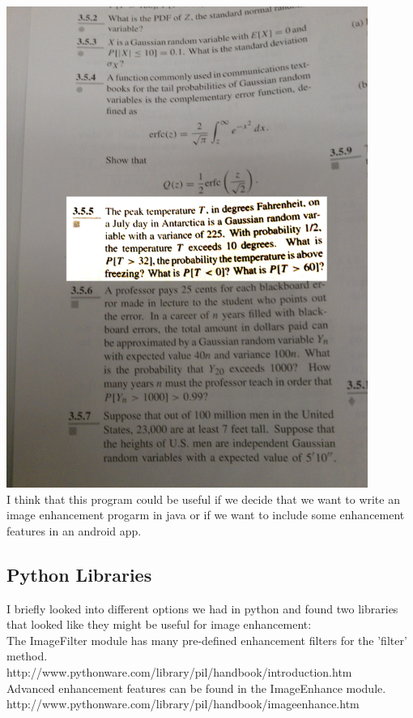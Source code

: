 \documentclass[]{article}
\begin{document}
		\includegraphics{images/ImageClarityWithImageJ.jpg} \\
		
		I think that this program could be useful if we decide that we want to write an image enhancement progarm in java or if we want to include some enhancement features in an android app. \\
		
		\subsection{Python Libraries}
		
		I briefly looked into different options we had in python and found two libraries that looked like they might be useful for image enhancement: \\
		
		The ImageFilter module has many pre-defined enhancement filters for the 'filter' method. \\
		http://www.pythonware.com/library/pil/handbook/introduction.htm\\
		
		Advanced enhancement features can be found in the ImageEnhance module. \\
		http://www.pythonware.com/library/pil/handbook/imageenhance.htm \\
		
\end{document}
